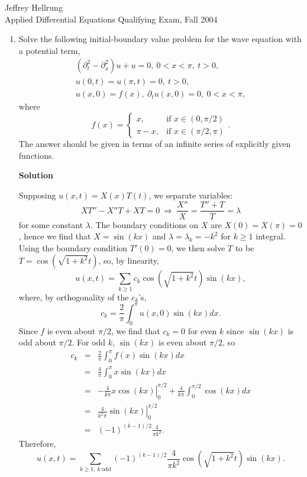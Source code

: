 \documentclass{article}
\begin{document}
\begin{flushright}
Jeffrey Hellrung \\
Applied Differential Equations Qualifying Exam, Fall 2004 \\
\end{flushright}


\begin{enumerate}

\item Solve the following initial-boundary value problem for the wave equation with a potential term,
\[\begin{array}{l}
  (\partial_t^2 - \partial_x^2) u + u = 0, \ 0 < x < \pi, \ t > 0, \\
  u(0,t) = u(\pi,t) = 0, \ t > 0, \\
  u(x,0) = f(x), \ \partial_t u(x,0) = 0, \ 0 < x < \pi,
  \end{array}\]
where
\[f(x) = \begin{cases} x, & \text{if \(x \in (0,\pi/2)\)} \\ \pi - x, & \text{if \(x \in (\pi/2,\pi)\)} \end{cases}.\]
The answer should be given in terms of an infinite series of explicitly given functions.

{\bf Solution}

Supposing \(u(x,t) = X(x) T(t)\), we separate variables:
\[X T'' - X'' T + X T = 0 \ \Rightarrow \ \frac{X''}{X} = \frac{T'' + T}{T} = \lambda\]
for some constant \(\lambda\).  The boundary conditions on \(X\) are \(X(0) = X(\pi) = 0\), hence we find that \(X = \sin(k x)\) and \(\lambda = \lambda_k = -k^2\) for \(k \geq 1\) integral.  Using the boundary condition \(T'(0) = 0\), we then solve \(T\) to be \(T = \cos \left( \sqrt{1 + k^2} t \right)\), so, by linearity,
\[u(x,t) = \sum_{k \geq 1} c_k \cos \left( \sqrt{1 + k^2} t \right) \sin(k x),\]
where, by orthogonality of the \(c_k\)'s,
\[c_k = \frac{2}{\pi} \int_0^{\pi} u(x,0) \sin(k x) dx.\]
Since \(f\) is even about \(\pi/2\), we find that \(c_k = 0\) for even \(k\) since \(\sin(k x)\) is odd about \(\pi/2\).  For odd \(k\), \(\sin(k x)\) is even about \(\pi/2\), so
\begin{eqnarray*}
c_k & = & \frac{2}{\pi} \int_0^{\pi} f(x) \sin(k x) dx \\
    & = & \frac{4}{\pi} \int_0^{\pi} x \sin(k x) dx \\
    & = & \left. -\frac{4}{k \pi} x \cos(k x) \right|_0^{\pi/2} + \frac{4}{k \pi} \int_0^{\pi/2} \cos(k x) dx \\
    & = & \left. \frac{4}{k^2 \pi} \sin(k x) \right|_0^{\pi/2} \\
    & = & (-1)^{(k - 1)/2} \frac{4}{\pi k^2}.
\end{eqnarray*}
Therefore,
\[u(x,t) = \sum_{k \geq 1, \ k \ \text{odd}} (-1)^{(k - 1)/2} \frac{4}{\pi k^2} \cos \left( \sqrt{1 + k^2} t \right) \sin(k x).\]




\end{enumerate}
\end{document}
